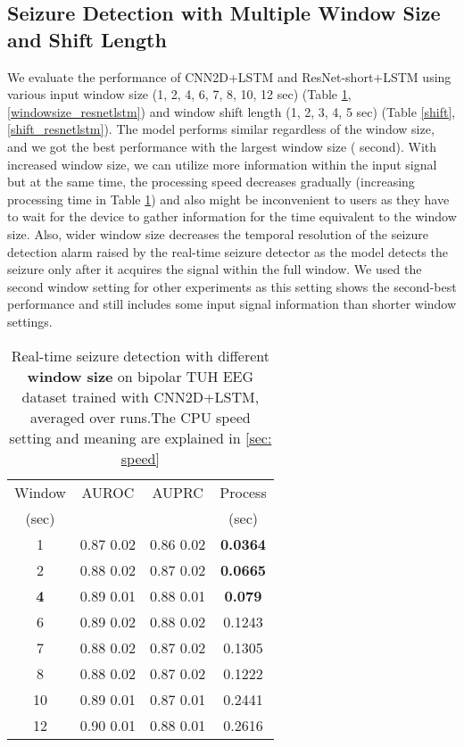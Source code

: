 \documentclass[pmlr,twocolumn,10pt]{jmlr}
\begin{document}
\subsection{Seizure Detection with Multiple Window Size and Shift Length}
\label{sec:windowshift}
We evaluate the performance of CNN2D+LSTM and ResNet-short+LSTM using various input window size (1, 2, 4, 6, 7, 8, 10, 12 sec) (Table \ref{windowsize}, \ref{windowsize_resnetlstm}) and window shift length (1, 2, 3, 4, 5 sec) (Table \ref{shift}, \ref{shift_resnetlstm}). The model performs similar regardless of the window size, and we got the best performance with the largest window size ( second). With increased window size, we can utilize more information within the input signal but at the same time, the processing speed decreases gradually (increasing processing time in Table \ref{windowsize}) and also might be inconvenient to users as they have to wait for the device to gather information for the time equivalent to the window size. Also, wider window size decreases the temporal resolution of the seizure detection alarm raised by the real-time seizure detector as the model detects the seizure only after it acquires the signal within the full window. We used the  second window setting for other experiments as this setting shows the second-best performance and still includes some input signal information than shorter window settings.
\begin{table}[h!]
    \small
	\centering
	\caption{Real-time seizure detection with different \textbf{window size} on  bipolar TUH EEG dataset trained with CNN2D+LSTM, averaged over  runs.The CPU speed setting and meaning are explained in \ref{sec: speed}}
	\label{windowsize}
	\begin{tabular}{c|ccc}
		\toprule
		Window & AUROC & AUPRC & Process\\
		(sec) &&& (sec)\\
		\midrule
		1 & 0.87  0.02 & 0.86  0.02 & \textbf{0.0364} \\
		2  & 0.88  0.02 & 0.87  0.02  & \textbf{0.0665} \\
		\textbf{4} & 0.89  0.01 & 0.88  0.01 & \textbf{0.079}\\
		6  & 0.89  0.02 & 0.88  0.02 & 0.1243 \\
		7  & 0.88  0.02 & 0.87  0.02 & 0.1305 \\
		8  & 0.88  0.02 & 0.87  0.02 & 0.1222 \\
		10  & 0.89  0.01 & 0.87  0.01 & 0.2441 \\
		12  & 0.90  0.01 & 0.88 0.01  & 0.2616 \\
		\bottomrule
	\end{tabular}
\end{table}
\end{document}
